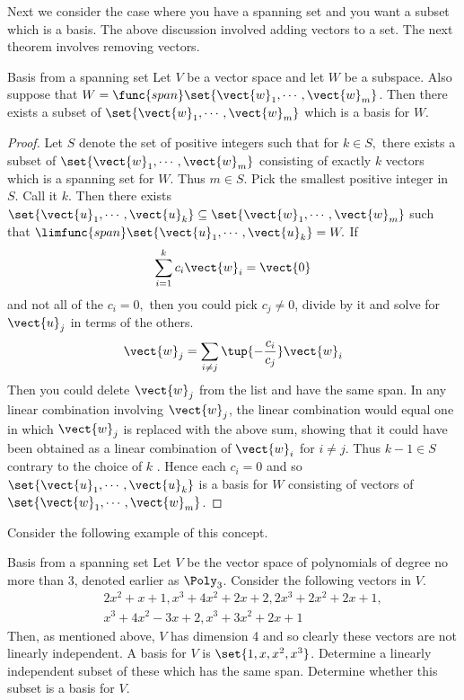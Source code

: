 Next we consider the case where you have a
spanning set and you want a subset which is a basis. The above discussion involved adding vectors to a set. The next theorem involves removing vectors. 

\begin{theorem}{Basis from a spanning set}{}
Let $V$ be a vector space and let $W$ be a subspace. Also
suppose that $W=\func{span}\set{\vect{w}_{1},\cdots ,\vect{w}
_{m}} $. Then there exists a subset of $\set{\vect{w}_{1},\cdots ,
\vect{w}_{m}} $ which is a basis for $W$.
\end{theorem}

\begin{proof}
Let $S$ denote the set of positive integers such that for $
k\in S,$ there exists a subset of $\set{\vect{w}_{1},\cdots ,\vect{w}
_{m}} $ consisting of exactly $k$ vectors which is a spanning set for 
$W$. Thus $m\in S$. Pick the smallest positive integer in $S$. Call it $k$.
Then there exists $\set{\vect{u}_{1},\cdots ,\vect{u}_{k}} \subseteq
\set{\vect{w}_{1},\cdots ,\vect{w}_{m}} $ such that $\limfunc{span}
\set{\vect{u}_{1},\cdots ,\vect{u}_{k}} =W.$ If 
\begin{equation*}
\sum_{i=1}^{k}c_{i}\vect{w}_{i}=\vect{0}
\end{equation*}
and not all of the $c_{i}=0,$ then you could pick $c_{j}\neq 0$, divide by
it and solve for $\vect{u}_{j}$ in terms of the others. 
\begin{equation*}
\vect{w}_{j}=\sum_{i\neq j}\tup{-\frac{c_{i}}{c_{j}}} \vect{w}_{i}
\end{equation*}
Then you could delete $\vect{w}_{j}$ from the list and have the same span.
In any linear combination involving $\vect{w}_{j}$, the linear
combination would equal one in which $\vect{w}_{j}$ is replaced with the
above sum, showing that it could have been obtained as a linear combination
of $\vect{w}_{i}$ for $i\neq j$. Thus $k-1\in S$ contrary to the choice of $k$
. Hence each $c_{i}=0$ and so $\set{\vect{u}_{1},\cdots ,\vect{u}
_{k}} $ is a basis for $W$ consisting of vectors of $\set{\vect{w}
_{1},\cdots ,\vect{w}_{m}} $. 
\end{proof}

Consider the following example of this concept. 

\begin{example}{Basis from a spanning set}{}
Let $V$ be the vector space of polynomials of degree no more than 3,
denoted earlier as $\Poly_{3}$. Consider the following vectors in $V$.
\begin{eqnarray*}
&&2x^{2}+x+1,x^{3}+4x^{2}+2x+2,2x^{3}+2x^{2}+2x+1, \\
&&x^{3}+4x^{2}-3x+2,x^{3}+3x^{2}+2x+1
\end{eqnarray*}
Then, as mentioned above, $V$ has dimension 4 and so clearly these vectors
are not linearly independent. A basis for $V$ is $\set{
1,x,x^{2},x^{3}} $. Determine a linearly independent subset of these
which has the same span. Determine whether this subset is a basis for $V$.
\end{example}

